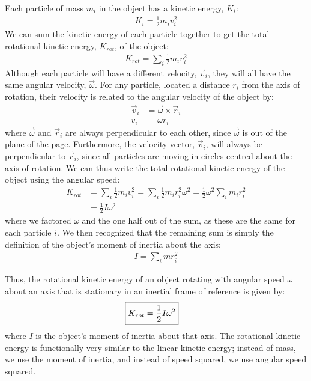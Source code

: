Each particle of mass $m_i$ in the object has a kinetic energy, $K_i$:
\begin{align*}
K_i = \frac{1}{2}m_iv_i^2
\end{align*} 
We can sum the kinetic energy of each particle together to get the total rotational kinetic energy, $K_{rot}$, of the object:
\begin{align*}
K_{rot} = \sum_i \frac{1}{2}m_iv_i^2
\end{align*}
Although each particle will have a different velocity, $\vec v_i$, they will all have the same angular velocity, $\vec\omega$. For any particle, located a distance $r_i$ from the axis of rotation, their velocity is related to the angular velocity of the object by:
\begin{align*}
\vec v_i &= \vec \omega \times \vec r_i\\
v_i &= \omega r_i
\end{align*}
where $\vec \omega$ and $\vec r_i$ are always perpendicular to each other, since $\vec\omega$ is out of the plane of the page. Furthermore, the velocity vector, $\vec v_i$, will always be perpendicular to $\vec r_i$, since all particles are moving in circles centred about the axis of rotation.  We can thus write the total rotational kinetic energy of the object using the angular speed:
\begin{align*}
K_{rot} &= \sum_i \frac{1}{2}m_iv_i^2 = \sum_i \frac{1}{2}m_ir_i^2\omega^2= \frac{1}{2} \omega^2 \sum_i m_ir_i^2\\
&=\frac{1}{2}I\omega^2
\end{align*}
where we factored $\omega$ and the one half out of the sum, as these are the same for each particle $i$. We then recognized that the remaining sum is simply the definition of the object's moment of inertia about the axis:
\begin{align*}
I = \sum_i mr_i^2
\end{align*}

Thus, the rotational kinetic energy of an object rotating with angular speed $\omega$ about an axis that is stationary in an inertial frame of reference is given by:
\begin{align}
\Aboxed{K_{rot}=\frac{1}{2}I\omega^2}
\end{align}
where $I$ is the object's moment of inertia about that axis. The rotational kinetic energy is functionally very similar to the linear kinetic energy; instead of mass, we use the moment of inertia, and instead of speed squared, we use angular speed squared. 

